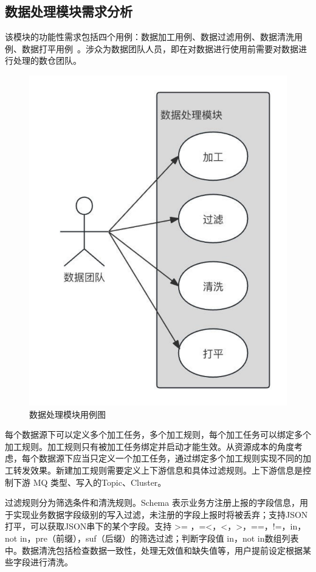 \subsection{数据处理模块需求分析}

该模块的功能性需求包括四个用例：数据加工用例、数据过滤用例、数据清洗用例、数据打平用例~\cite{严霄凤2013大数据研究}。涉众为数据团队人员，即在对数据进行使用前需要对数据进行处理的数仓团队。
\begin{figure}[htb]
  \centering
  \includegraphics[width=5in]{figure/chapter3/数据处理模块用例图.pdf}
  \caption{数据处理模块用例图}\label{dataColl}
\end{figure}

每个数据源下可以定义多个加工任务，多个加工规则，每个加工任务可以绑定多个加工规则。加工规则只有被加工任务绑定并启动才能生效。从资源成本的角度考虑，每个数据源下应当只定义一个加工任务，通过绑定多个加工规则实现不同的加工转发效果。新建加工规则需要定义上下游信息和具体过滤规则。上下游信息是控制下游 MQ 类型、写入的Topic、Cluster。

过滤规则分为筛选条件和清洗规则。Schema 表示业务方注册上报的字段信息，用于实现业务数据字段级别的写入过滤，未注册的字段上报时将被丢弃；支持JSON打平，可以获取JSON串下的某个字段。支持 >= ，=<，<，>，==，!=，in，not in，pre（前缀），suf（后缀）的筛选过滤；判断字段值 in，not in数组列表中。数据清洗包括检查数据一致性，处理无效值和缺失值等，用户提前设定根据某些字段进行清洗。

